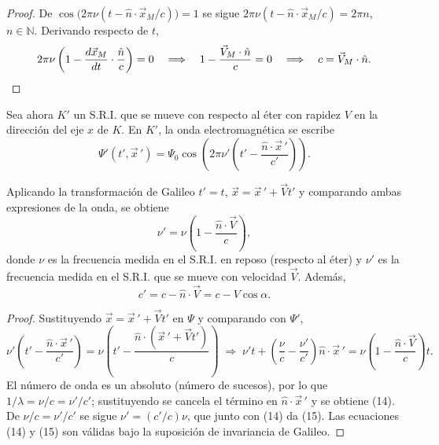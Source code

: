 \begin{proof}
De $\cos\big(2\pi\nu(t-\hat n\cdot\vec x_M/c)\big)=1$ se sigue
$2\pi\nu(t-\hat n\cdot\vec x_M/c)=2\pi n$, $n\in\mathbb{N}$. Derivando
respecto de $t$,
\[
2\pi\nu\left(1-\frac{d\vec x_M}{dt}\cdot\frac{\hat n}{c}\right)=0
\quad\Longrightarrow\quad 1-\frac{\vec V_M\cdot\hat n}{c}=0
\quad\Longrightarrow\quad c=\vec V_M\cdot\hat n . \qedhere
\]
\end{proof}

Sea ahora $K'$ un S.R.I. que se mueve con respecto al éter con rapidez
$V$ en la dirección del eje $x$ de $K$. En $K'$, la onda electromagnética
se escribe
\[
\Psi'(t',\vec x\,') = \Psi_0\cos\!\left(2\pi\nu'\left(t'-\frac{\hat
n\cdot\vec x\,'}{c'}\right)\right).
\]

\begin{proposicionc}
Aplicando la transformación de Galileo $t'=t$, $\vec x = \vec x\,'+\vec
Vt'$ y comparando ambas expresiones de la onda, se obtiene
\[
\nu' = \nu\left(1-\frac{\hat n\cdot\vec V}{c}\right), \tag{14}
\]
donde $\nu$ es la frecuencia medida en el S.R.I. en reposo (respecto al
éter) y $\nu'$ es la frecuencia medida en el S.R.I. que se mueve con
velocidad $\vec V$. Además,
\[
c' = c - \hat n\cdot\vec V = c-V\cos\alpha . \tag{15}
\]
\end{proposicionc}

\begin{proof}
Sustituyendo $\vec x=\vec x\,'+\vec Vt'$ en $\Psi$ y comparando con
$\Psi'$,
\[
\nu'\left(t'-\frac{\hat n\cdot\vec x\,'}{c'}\right) = \nu\left(t'-
\frac{\hat n\cdot(\vec x\,'+\vec Vt')}{c}\right) \;\Longrightarrow\;
\nu't + \left(\frac{\nu}{c}-\frac{\nu'}{c'}\right)\hat n\cdot\vec x\,' =
\nu\left(1-\frac{\hat n\cdot\vec V}{c}\right)t .
\]
El número de onda es un absoluto (número de sucesos), por lo que
$1/\lambda=\nu/c=\nu'/c'$; sustituyendo se cancela el término en
$\hat n\cdot\vec x\,'$ y se obtiene (14). De $\nu/c=\nu'/c'$ se sigue
$\nu'=(c'/c)\nu$, que junto con (14) da (15). Las ecuaciones (14) y (15)
son válidas bajo la suposición de invariancia de Galileo. \qedhere
\end{proof}

